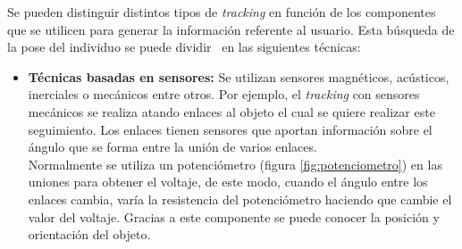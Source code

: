 Se pueden distinguir distintos tipos de \textit{tracking} en función de los componentes que se utilicen para generar la información referente al usuario. Esta búsqueda de la pose del individuo se puede dividir~\cite{tracking1} en las siguientes técnicas:  

\begin{itemize}
    \item \textbf{Técnicas basadas en sensores:} Se utilizan sensores magnéticos, acústicos, inerciales o mecánicos entre otros. Por ejemplo, el \textit{tracking} con sensores mecánicos se realiza atando enlaces al objeto el cual se quiere realizar este seguimiento. Los enlaces tienen sensores que aportan información sobre el ángulo que se forma entre la unión de varios enlaces.\\
    
    
    Normalmente se utiliza un potenciómetro (figura \ref{fig:potenciometro}) en las uniones para obtener el voltaje, de este modo, cuando el ángulo entre los enlaces cambia, varía la resistencia del potenciómetro haciendo que cambie el valor del voltaje. Gracias a este componente se puede conocer la posición y orientación del objeto.
    

\end{itemize}

